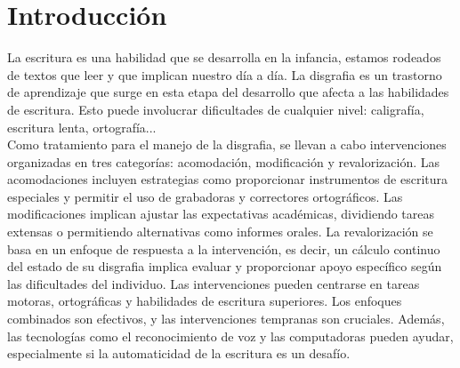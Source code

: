 \section{Introducción}
La escritura es una habilidad que se desarrolla en la infancia, estamos rodeados de textos que leer y que implican nuestro día a día. La disgrafia es un trastorno de aprendizaje que surge en esta etapa del desarrollo que afecta a las habilidades de escritura. Esto puede involucrar dificultades de cualquier nivel: caligrafía, escritura lenta, ortografía...\\

Como tratamiento para el manejo de la disgrafia, se llevan a cabo intervenciones organizadas en tres categorías: acomodación, modificación y revalorización. Las acomodaciones incluyen estrategias como proporcionar instrumentos de escritura especiales y permitir el uso de grabadoras y correctores ortográficos. Las modificaciones implican ajustar las expectativas académicas, dividiendo tareas extensas o permitiendo alternativas como informes orales. La revalorización se basa en un enfoque de respuesta a la intervención, es decir, un cálculo continuo del estado de su disgrafia implica evaluar y proporcionar apoyo específico según las dificultades del individuo. Las intervenciones pueden centrarse en tareas motoras, ortográficas y habilidades de escritura superiores. Los enfoques combinados son efectivos, y las intervenciones tempranas son cruciales. Además, las tecnologías como el reconocimiento de voz y las computadoras pueden ayudar, especialmente si la automaticidad de la escritura es un desafío. \cite{Chung2015}